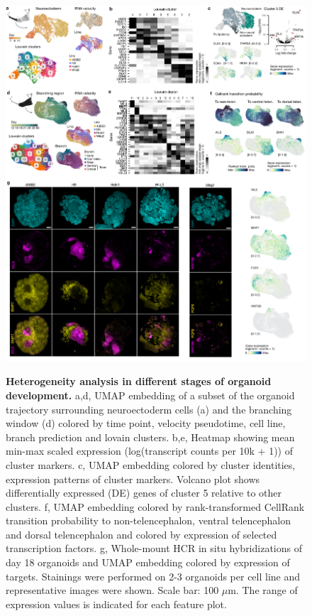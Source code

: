 \begin{figure}[h!]
    \centering
	\includegraphics[width=\textwidth]{figures/pando/Figure_S2}
    \label{fig:regS2}
    \caption{\textbf{Heterogeneity analysis in different stages of organoid development.} a,d, UMAP embedding of a subset of the organoid trajectory surrounding neuroectoderm cells (a) and the branching window (d) colored by time point, velocity pseudotime, cell line, branch prediction and lovain clusters. b,e, Heatmap showing mean min-max scaled expression (log(transcript counts per 10k + 1)) of cluster markers. c, UMAP embedding colored by cluster identities, expression patterns of cluster markers. Volcano plot shows differentially expressed (DE) genes of cluster 5 relative to other clusters. f, UMAP embedding colored by rank-transformed CellRank transition probability to non-telencephalon, ventral telencephalon and dorsal telencephalon and colored by expression of selected transcription factors. g, Whole-mount HCR in situ hybridizations of day 18 organoids and UMAP embedding colored by expression of targets. Stainings were performed on 2-3 organoids per cell line and representative images were shown. Scale bar: 100 $\mu$m. The range of expression values is indicated for each feature plot.}
\end{figure}


